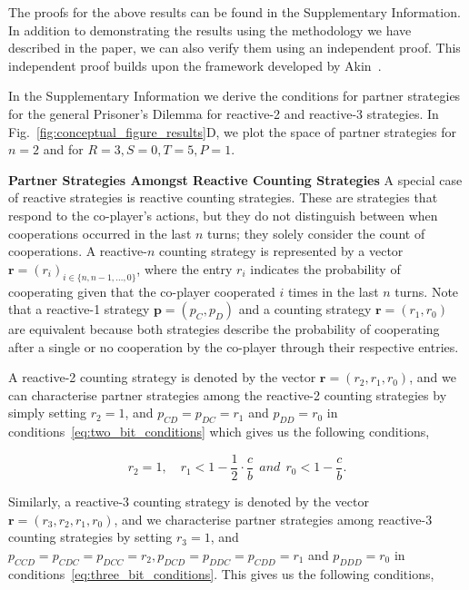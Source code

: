 \documentclass[11pt]{article}
\begin{document}
The proofs for the above results can be found in the Supplementary Information.
In addition to demonstrating the results using the methodology we have described
in the paper, we can also verify them using an independent proof. This
independent proof builds upon the framework developed by
Akin~\cite{akin:EGADS:2016}.

In the Supplementary Information we derive the conditions for partner strategies
for the general Prisoner's Dilemma for reactive-2 and reactive-3 strategies. In
Fig.~\ref{fig:conceptual_figure_results}D, we plot the space of partner
strategies for $n=2$ and for $R =3, S=0, T=5, P=1$.

\textbf{Partner Strategies Amongst Reactive Counting Strategies}
A special case of reactive strategies is reactive counting strategies. These are
strategies that respond to the co-player's actions, but they do not distinguish
between when cooperations occurred in the last $n$ turns; they solely consider
the count of cooperations. A reactive-$n$ counting strategy is represented by a
vector $\mathbf{r}=(r_i)_{i \in \{n, n -1, \dots, 0\}}$, where the entry \(r_i\)
indicates the probability of cooperating given that the co-player cooperated
\(i\) times in the last \(n\) turns. Note that a reactive-1 strategy
$\mathbf{p}=(p_{C}, p_{D})$ and a counting strategy $\mathbf{r}=(r_1, r_0)$ are
equivalent because both strategies describe the probability of cooperating after
a single or no cooperation by the co-player through their respective entries. 

A reactive-2 counting strategy is denoted by the vector $\mathbf{r}=(r_2,
r_1, r_0)$, and we can characterise partner strategies among the reactive-2
counting strategies by simply setting $r_2 = 1$, and $p_{CD} = p_{DC} = r_1$ and
$p_{DD} = r_0$ in conditions~\eqref{eq:two_bit_conditions} which gives us the
following conditions,

\begin{equation}\label{eq:counting_two_bit_conditions}
  r_2 = 1, \quad \displaystyle r_1 < 1-\frac{1}{2} \cdot \frac{c}{b} ~~and~~ r_0 < 1\!-\! \frac{c}{b}.
\end{equation}

Similarly, a reactive-3 counting strategy is denoted by the vector
$\mathbf{r}=(r_3, r_2, r_1, r_0)$, and we characterise partner strategies among
reactive-3 counting strategies by setting $r_3 = 1$, and $p_{CCD} = p_{CDC} =
p_{DCC} = r_2, p_{DCD} = p_{DDC} = p_{CDD} = r_1$ and $p_{DDD} = r_0$ in
conditions~\eqref{eq:three_bit_conditions}. This gives us the following
conditions,
\end{document}
